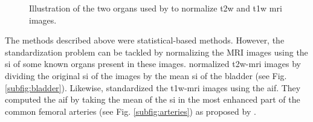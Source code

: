 \begin{enumerate}[leftmargin=*]
\begin{figure}
\centering
	\hspace*{\fill}
	 \hfill
	\hspace*{\fill}
	\caption{Illustration of the two organs used by \cite{Niaf2011,Niaf2012} to normalize \ac{t2w} and \ac{t1w} \ac{mri} images.}
	\label{fig:niaf}
\end{figure}

The methods described above were statistical-based methods. However, the standardization problem can be tackled by normalizing the MRI images using the \ac{si} of some known organs present in these images. \cite{Niaf2011,Niaf2012} normalized \ac{t2w}-\ac{mri} images by dividing the original \ac{si} of the images by the mean \ac{si} of the bladder (see Fig. \ref{subfig:bladder}). Likewise, \cite{Niaf2011} standardized the \ac{t1w}-\ac{mri} images using the \ac{aif}. They computed the \ac{aif} by taking the mean of the \ac{si} in the most enhanced part of the common femoral arteries (see Fig. \ref{subfig:arteries}) as proposed by \cite{Wiart2007}.

\end{enumerate}

